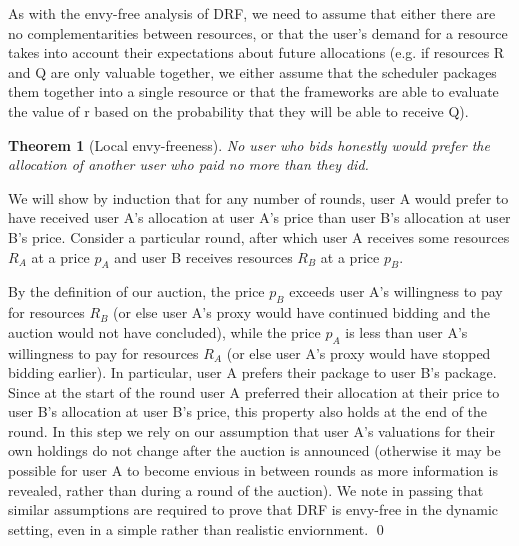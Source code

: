\documentclass{acm_proc_article-sp}
\newtheorem{theorem}{Theorem}[section]
\newenvironment{pproof}[1][Proof]{\begin{trivlist}
\item[\hskip \labelsep {\bfseries #1}]}{\end{trivlist}}
\begin{document}
As with the envy-free analysis of DRF, we need to assume that either there are no complementarities between resources, or that the user's demand for a resource takes into account their expectations about future allocations (e.g. if resources R and Q are only valuable together, we either assume that the scheduler packages them together into a single resource or that the frameworks are able to evaluate the value of r based on the probability that they will be able to receive Q).
\vspace{-5mm}
\begin{theorem}[Local envy-freeness]
No user who bids honestly would prefer the allocation of another user who paid no more than they did.
\end{theorem}
\vspace{-5mm}
\begin{pproof}
We will show by induction that for any number of rounds, user A would prefer to have received user A's allocation at user A's price than user B's allocation at user B's price. Consider a particular round, after which user A receives some resources $R_A$ at a price $p_A$ and user B receives resources $R_B$ at a price $p_B$.

By the definition of our auction, the price $p_B$ exceeds user A's willingness to pay for resources $R_B$ 
(or else user A's proxy would have continued bidding and the auction would not have concluded), 
while the price $p_A$ is less than user A's willingness to pay for resources $R_A$ 
(or else user A's proxy would have stopped bidding earlier). 
In particular, user A prefers their package to user B's package. 
Since at the start of the round user A preferred their allocation at their price to user B's allocation at user B's price, 
this property also holds at the end of the round. 
In this step we rely on our assumption that user A's valuations for their own holdings do not change after the auction is announced 
(otherwise it may be possible for user A to become envious in between rounds as more information is revealed, rather than during a round of the auction). 
We note in passing that similar assumptions are required to prove that DRF is envy-free in the dynamic setting,
even in a simple rather than realistic enviornment.
\qed
\end{pproof}
\end{document}
